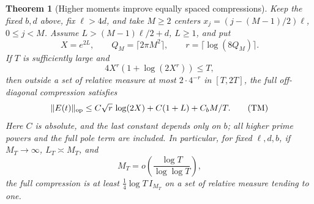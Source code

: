\documentclass[11pt]{article}
\newtheorem{theorem}{Theorem}
\theoremstyle{remark}\newtheorem{remark}[theorem]{Remark}
\begin{document}
\begin{theorem}[Higher moments improve equally spaced compressions]
\label{thm:toeplitz-moments}
Keep the fixed $b,d$ above, fix $\ell>4d$, and take $M\ge2$ centers
$x_j=(j-(M-1)/2)\ell$, $0\le j<M$. Assume
$L> (M-1)\ell/2+d$, $L\ge1$, and put
\[
 X=e^{2L},\qquad Q_M=\lceil2\pi M^2\rceil,\qquad
 r=\lceil\log(8Q_M)\rceil.
\]
If $T$ is sufficiently large and
\[
 4X^r(1+\log(2X^r))\le T,                             \tag{ML}
\]
then outside a set of relative measure at most $2\cdot4^{-r}$
in $[T,2T]$, the full off-diagonal compression satisfies
\[
 \|E(t)\|_{\rm op}
 \le C\sqrt r\,\log(2X)+C(1+L)+C_bM/T.                \tag{TM}
\]
Here $C$ is absolute, and the last constant depends only on $b$;
all higher prime powers and the full pole term are included.
In particular, for fixed $\ell,d,b$, if $M_T\to\infty$,
$L_T\asymp M_T$, and
\[
 M_T=o\left(\frac{\log T}{\log\log T}\right),           \tag{TS}
\]
the full compression is at least $\frac14\log T\,I_{M_T}$
on a set of relative measure tending to one.
\end{theorem}
\end{document}
